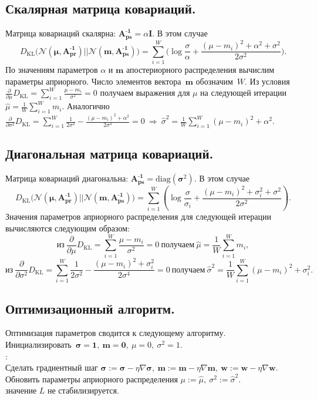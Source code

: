 \documentclass[12pt, fleqn, unicode]{article}
\newcommand{\NNN}{{\mathcal{N}}}
\newcommand{\bw}{{\textbf{w}}}
\newcommand{\II}{{\textbf{I}}}
\newcommand{\bm}{{\textbf{m}}}
\newcommand{\bs}{{\boldsymbol{\sigma}}}
\newcommand{\bApr}{\mathbf{A^\text{-1}_{\text{pr}}}}
\newcommand{\bAps}{\mathbf{A^\text{-1}_{\text{ps}}}}
\newcommand{\bmupr}{\boldsymbol{\mu}}
\newcommand{\bmups}{\textbf{m}}
\newcommand{\DKL}{\mathit{D}_{\text{KL}}}
\begin{document}
\subsection{Скалярная матрица ковариаций.}
Матрица ковариаций скалярна: $\bAps = \alpha \II$.
В этом случае $$
\DKL\bigl(\NNN(\bmupr,\bApr)||\NNN(\bmups,\bAps)\bigr) = \sum\limits_{i=1}^W\big(\log\frac{\sigma}{\alpha} + \frac{(\mu-m_i)^2 + \alpha^2 + \sigma^2}{2\sigma^2}\big).
$$
По значениям параметров $\alpha$ и $\bm$ апостериорного распределения  вычислим  параметры априорного. Число элементов вектора~$\bm$ обозначим~$W$. Из условия $\frac\partial{\partial\mu}\DKL = \sum_{i=1}^W\frac{\mu-m_i}{\sigma^2}=0$ получаем выражения для $\mu$ на следующей итерации $\hat{\mu} = \frac1W\sum_{i=1}^W m_i$.
Аналогично $\frac\partial{\partial\sigma^2}\DKL = \sum_{i=1}^W \frac1{2\sigma^2}-\frac{(\mu-m_i)^2 + \alpha^2}{2\sigma^4}=0 \ \Rightarrow \ \hat{\sigma}^2 = \frac1W\sum_{i=1}^W (\mu-m_i)^2 + \alpha^2$.

\subsection{Диагональная матрица ковариаций.} Матрица ковариаций диагональна: $\bAps = \text{diag}(\bs^2)$.	
В этом случае \[\DKL\bigl(\NNN(\bmupr,\bApr)||\NNN(\bmups,\bAps)\bigr) = \sum\limits_{i=1}^W(\log\frac{\sigma}{\sigma_i} + \frac{(\mu-m_i)^2 + \sigma_i^2 + \sigma^2}{2\sigma^2}).\]
Значения параметров априорного распределения для следующей итерации вычисляются следующим образом:
\[ \text{из} \ \frac\partial{\partial\mu}\DKL = \sum\limits_{i=1}^W\frac{\mu-m_i}{\sigma^2}=0 \ \text{получаем} \ \hat{\mu} = \frac1W\sum\limits_{i=1}^W m_i,\]
\[ \text{из} \ \frac\partial{\partial\sigma^2}\DKL = \sum\limits_{i=1}^W \frac1{2\sigma^2}-\frac{(\mu-m_i)^2 + \sigma_i^2}{2\sigma^4}=0 \ \text{получаем} \ \hat{\sigma}^2 = \frac1W\sum\limits_{i=1}^W (\mu-m_i)^2 + \sigma_i^2.\]

\subsection{Оптимизационный алгоритм.}
Оптимизация параметров сводится к следующему алгоритму.\\
\indent \indent Инициализировать~$\bs = \textbf{1}, \ \bm = \textbf{0}, \ \mu = 0, \ \sigma^2 = 1$.\\
\indent {}:\\
\indent \indent Сделать градиентный шаг $\bs:=\bs-\eta\nabla\bs, \ \bm:=\bm-\eta\nabla\bm, \ \bw := \bw - \eta \nabla \bw$.\\
\indent \indent Обновить параметры априорного распределения $\mu:= \hat{\mu}, \ \sigma^2:=\hat{\sigma}^2$.\\
\indent {} значение $L$ не стабилизируется.
\end{document}
